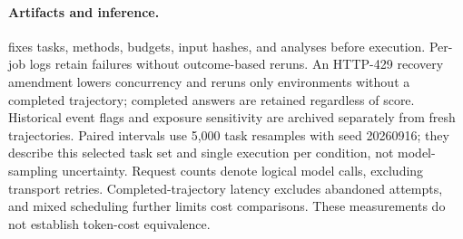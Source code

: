 \paragraph{Artifacts and inference.}
 fixes tasks, methods, budgets, input hashes, and analyses before execution. Per-job logs retain failures without outcome-based reruns. An HTTP-429 recovery amendment lowers concurrency and reruns only environments without a completed trajectory; completed answers are retained regardless of score. Historical event flags and exposure sensitivity are archived separately from fresh trajectories. Paired intervals use 5,000 task resamples with seed 20260916; they describe this selected task set and single execution per condition, not model-sampling uncertainty. Request counts denote logical model calls, excluding transport retries. Completed-trajectory latency excludes abandoned attempts, and mixed scheduling further limits cost comparisons. These measurements do not establish token-cost equivalence.
